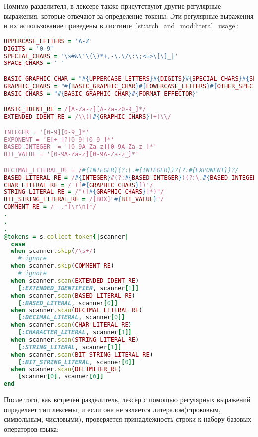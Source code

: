 Помимо разделителя, в лексере также присутствуют другие регулярные выражения, которые отвечают за определение токены. Эти регулярные выражения и их использование приведены в листинге
\ref{lst:arch_and_mod:literal_usage}:
\begin{lstlisting}[language=Ruby, style=rubystyle,caption={Определение и использование регулярных выражений для опознавания токена}, label=lst:lst:arch_and_mod:literal_usage]
UPPERCASE_LETTERS = 'A-Z'
DIGITS = '0-9'
SPECIAL_CHARS = '\s#&\'\(\)*+,-\.\/\:\;<=>\[\]_|'
SPACE_CHARS = ' '

BASIC_GRAPHIC_CHAR = "#{UPPERCASE_LETTERS}#{DIGITS}#{SPECIAL_CHARS}#{SPACE_CHARS}"
GRAPHIC_CHARS = "#{BASIC_GRAPHIC_CHAR}#{LOWERCASE_LETTERS}#{OTHER_SPECIAL_CHARS}"
BASIC_CHARS = "#{BASIC_GRAPHIC_CHAR}#{FORMAT_EFFECTOR}"

BASIC_IDENT_RE = /[A-Za-z][A-Za-z0-9_]*/
EXTENDED_IDENT_RE = /\\([#{GRAPHIC_CHARS}]+)\\/

INTEGER = '[0-9][0-9_]*'
EXPONENT = 'E[+-]?[0-9][0-9_]*'
BASED_INTEGER  = '[0-9A-Za-z][0-9A-Za-z_]*'
BIT_VALUE = '[0-9A-Za-z][0-9A-Za-z_]*'

DECIMAL_LITERAL_RE = /#{INTEGER}(?:\.#{INTEGER})?(?:#{EXPONENT})?/
BASED_LITERAL_RE = /#{INTEGER}#(?:#{BASED_INTEGER})(?:\.#{BASED_INTEGER})?#(?:#{EXPONENT})?/
CHAR_LITERAL_RE = /'([#{GRAPHIC_CHARS}])'/
STRING_LITERAL_RE = /"([#{GRAPHIC_CHARS}]*)"/
BIT_STRING_LITERAL_RE = /[BOX]"#{BIT_VALUE}"/
COMMENT_RE = /--.*[\r\n]*/
.
.
.
@tokens = s.collect_token{|scanner|
  case
  when scanner.skip(/\s+/)
    # ignore
  when scanner.skip(COMMENT_RE)
    # ignore
  when scanner.scan(EXTENDED_IDENT_RE)
    [:EXTENDED_IDENTIFIER, scanner[1]]
  when scanner.scan(BASED_LITERAL_RE)
    [:BASED_LITERAL, scanner[0]]
  when scanner.scan(DECIMAL_LITERAL_RE)
    [:DECIMAL_LITERAL, scanner[0]]
  when scanner.scan(CHAR_LITERAL_RE)
    [:CHARACTER_LITERAL, scanner[1]]
  when scanner.scan(STRING_LITERAL_RE)
    [:STRING_LITERAL, scanner[1]]
  when scanner.scan(BIT_STRING_LITERAL_RE)
    [:BIT_STRING_LITERAL, scanner[0]]
  when scanner.scan(DELIMITER_RE)
    [scanner[0], scanner[0]]
end
\end{lstlisting}
После того, как встречен разделитель, лексер с помощью регулярных выражений определяет тип лексемы, и если она не является литералом(строковым, символьным, числовыми), проверяется принадлежность строки к набору базовых операторов языка:

